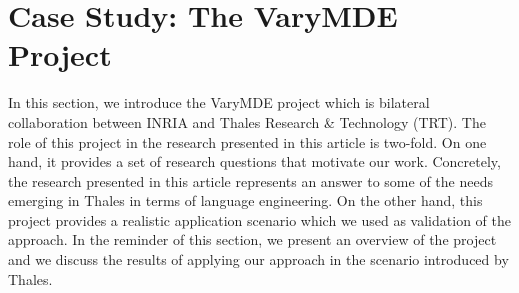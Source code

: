 \section{Case Study: The VaryMDE Project}
\label{sec:validation}

In this section, we introduce the VaryMDE project which is bilateral collaboration between INRIA and Thales Research \& Technology (TRT). The role of this project in the research presented in this article is two-fold. On one hand, it provides a set of research questions that motivate our work. Concretely, the research presented in this article represents an answer to some of the needs emerging in Thales in terms of language engineering. On the other hand, this project provides a realistic application scenario which we used as validation of the approach. In the reminder of this section, we present an overview of the project and we discuss the results of applying our approach in the scenario introduced by Thales.  



